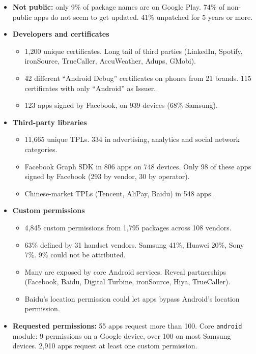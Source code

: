\documentclass[11pt,a4paper]{article}
\begin{document}
\begin{enumerate}
    \begin{itemize}
        \item \textbf{Not public:} only 9\% of package names are on Google Play. 74\% of non-public apps do not seem to get updated. 41\% unpatched for 5 years or more.
        \item \textbf{Developers and certificates}
        \begin{itemize}
            \item 1,200 unique certificates. Long tail of third parties (LinkedIn, Spotify, ironSource, TrueCaller, AccuWeather, Adups, GMobi).
            \item 42 different ``Android Debug'' certificates on phones from 21 brands. 115 certificates with only ``Android'' as Issuer.
            \item 123 apps signed by Facebook, on 939 devices (68\% Samsung).
        \end{itemize}
        \item \textbf{Third-party libraries}
        \begin{itemize}
            \item 11,665 unique TPLs. 334 in advertising, analytics and social network categories.
            \item Facebook Graph SDK in 806 apps on 748 devices. Only 98 of these apps signed by Facebook (293 by vendor, 30 by operator).
            \item Chinese-market TPLs (Tencent, AliPay, Baidu) in 548 apps.
        \end{itemize}
        \item \textbf{Custom permissions}
        \begin{itemize}
            \item 4,845 custom permissions from 1,795 packages across 108 vendors.
            \item 63\% defined by 31 handset vendors. Samsung 41\%, Huawei 20\%, Sony 7\%. 9\% could not be attributed.
            \item Many are exposed by core Android services. Reveal partnerships (Facebook, Baidu, Digital Turbine, ironSource, Hiya, TrueCaller).
            \item Baidu's location permission could let apps bypass Android's location permission.
        \end{itemize}
        \item \textbf{Requested permissions:} 55 apps request more than 100. Core \texttt{android} module: 9 permissions on a Google device, over 100 on most Samsung devices. 2,910 apps request at least one custom permission.

\end{itemize}
\end{enumerate}
\end{document}
